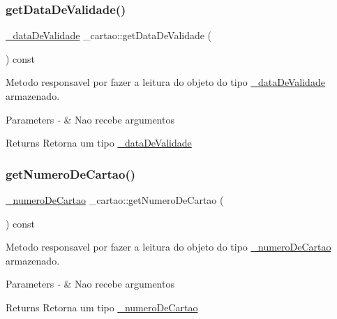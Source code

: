 \subsubsection{\texorpdfstring{getDataDeValidade()}{getDataDeValidade()}}
{\footnotesize\ttfamily \mbox{\hyperlink{class__data_de_validade}{\+\_\+data\+De\+Validade}} \+\_\+cartao\+::get\+Data\+De\+Validade (\begin{DoxyParamCaption}{ }\end{DoxyParamCaption}) const}



Metodo responsavel por fazer a leitura do objeto do tipo \mbox{\hyperlink{class__data_de_validade}{\+\_\+data\+De\+Validade}} armazenado. 


\begin{DoxyParams}{Parameters}
{\em -\/} & Nao recebe argumentos \\
\hline
\end{DoxyParams}
\begin{DoxyReturn}{Returns}
Retorna um tipo \mbox{\hyperlink{class__data_de_validade}{\+\_\+data\+De\+Validade}} 
\end{DoxyReturn}
\mbox{\label{class__cartao_adb85e866622841d0915b36f2f76e8019}} 
\subsubsection{\texorpdfstring{getNumeroDeCartao()}{getNumeroDeCartao()}}
{\footnotesize\ttfamily \mbox{\hyperlink{class__numero_de_cartao}{\+\_\+numero\+De\+Cartao}} \+\_\+cartao\+::get\+Numero\+De\+Cartao (\begin{DoxyParamCaption}{ }\end{DoxyParamCaption}) const}



Metodo responsavel por fazer a leitura do objeto do tipo \mbox{\hyperlink{class__numero_de_cartao}{\+\_\+numero\+De\+Cartao}} armazenado. 


\begin{DoxyParams}{Parameters}
{\em -\/} & Nao recebe argumentos \\
\hline
\end{DoxyParams}
\begin{DoxyReturn}{Returns}
Retorna um tipo \mbox{\hyperlink{class__numero_de_cartao}{\+\_\+numero\+De\+Cartao}} 
\end{DoxyReturn}
\mbox{\label{class__cartao_ad0c4c3f035c90eb7e879b8558e9d46d5}} 
